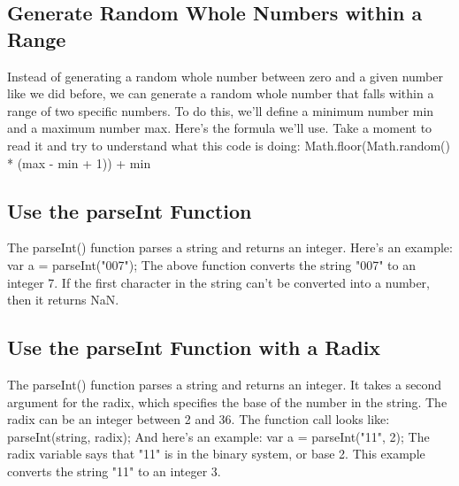 \documentclass{article}%
\begin{document}
%
\subsection{Generate Random Whole Numbers within a Range}%
\label{subsec:GenerateRandomWholeNumberswithinaRange}%
Instead of generating a random whole number between zero and a given number like we did before, we can generate a random whole number that falls within a range of two specific numbers.\newline%
To do this, we'll define a minimum number min and a maximum number max.\newline%
Here's the formula we'll use. Take a moment to read it and try to understand what this code is doing:\newline%
Math.floor(Math.random() * (max {-} min + 1)) + min\newline%

%
\subsection{Use the parseInt Function}%
\label{subsec:UsetheparseIntFunction}%
The parseInt() function parses a string and returns an integer. Here's an example:\newline%
var a = parseInt("007");\newline%
The above function converts the string "007" to an integer 7. If the first character in the string can't be converted into a number, then it returns NaN.\newline%

%
\subsection{Use the parseInt Function with a Radix}%
\label{subsec:UsetheparseIntFunctionwithaRadix}%
The parseInt() function parses a string and returns an integer. It takes a second argument for the radix, which specifies the base of the number in the string. The radix can be an integer between 2 and 36.\newline%
The function call looks like:\newline%
parseInt(string, radix);\newline%
And here's an example:\newline%
var a = parseInt("11", 2);\newline%
The radix variable says that "11" is in the binary system, or base 2. This example converts the string "11" to an integer 3.\newline%
\end{document}
